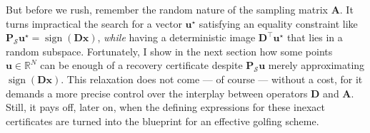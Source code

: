 But before we rush, remember the random nature of the sampling matrix $\mathbf{A}$. It turns impractical the search for a vector $\mathbf{u}^\star$ satisfying an equality constraint like $\mathbf{P}_{\mathcal{S}} \mathbf{u}^\star =  \operatorname{sign} \left ( \mathbf{Dx} \right )$, \emph{while} having a deterministic image $\mathbf{D}^\top \mathbf{u}^\star$ that lies in a random subspace. Fortunately, I show in the next section how some points $\mathbf{u} \in \mathbb{R}^{N}$ can be enough of a recovery certificate despite $\mathbf{P}_{\mathcal{S}} \mathbf{u}$ merely approximating $\operatorname{sign} \left ( \mathbf{Dx} \right )$. This relaxation does not come --- of course --- without a cost, for it demands a more precise control over the interplay between operators $\mathbf{D}$ and $\mathbf{A}$. Still, it pays off, later on, when the defining expressions for these inexact certificates are turned into the blueprint for an effective golfing scheme.